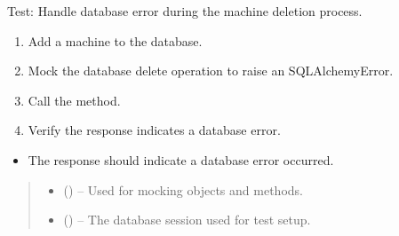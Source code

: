 \documentclass[letterpaper,10pt,english]{sphinxmanual}
\begin{document}
\begin{fulllineitems}
\label{\detokenize{test:test.test_machine.test_delete_machine_db_error}}
\pysigstartsignatures
\pysiglinewithargsret
{}
{\sphinxparamcomma {}}
{}
\pysigstopsignatures
\sphinxAtStartPar
Test: Handle database error during the machine deletion process.
\begin{description}
\begin{enumerate}
%
\item {} 
\sphinxAtStartPar
Add a machine to the database.

\item {} 
\sphinxAtStartPar
Mock the database delete operation to raise an SQLAlchemyError.

\item {} 
\sphinxAtStartPar
Call the  method.

\item {} 
\sphinxAtStartPar
Verify the response indicates a database error.

\end{enumerate}

\begin{itemize}
\item {} 
\sphinxAtStartPar
The response should indicate a database error occurred.

\end{itemize}

\end{description}
\begin{quote}\begin{description}
\begin{itemize}
\item {} 
\sphinxAtStartPar
{} () – Used for mocking objects and methods.

\item {} 
\sphinxAtStartPar
{} () – The database session used for test setup.

\end{itemize}

\end{description}\end{quote}

\end{fulllineitems}
\end{document}

